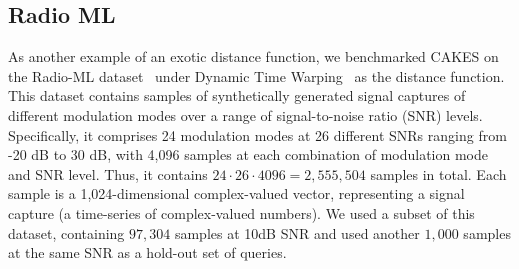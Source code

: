 \subsection{Radio ML}
\label{sec:datasets-and-benchmarks:radio-ml}

As another example of an exotic distance function, we benchmarked CAKES on the Radio-ML dataset~\cite{oshea2018radioml} under Dynamic Time Warping~\cite{muller2007dynamic} as the distance function.
This dataset contains samples of synthetically generated signal captures of different modulation modes over a range of signal-to-noise ratio (SNR) levels.
Specifically, it comprises 24 modulation modes at 26 different SNRs ranging from -20 dB to 30 dB, with 4,096 samples at each combination of modulation mode and SNR level.
Thus, it contains $24 \cdot 26 \cdot 4096 = 2,555,504$ samples in total.
Each sample is a 1,024-dimensional complex-valued vector, representing a signal capture (a time-series of complex-valued numbers).
We used a subset of this dataset, containing $97,304$ samples at 10dB SNR and used another $1,000$ samples at the same SNR as a hold-out set of queries.







